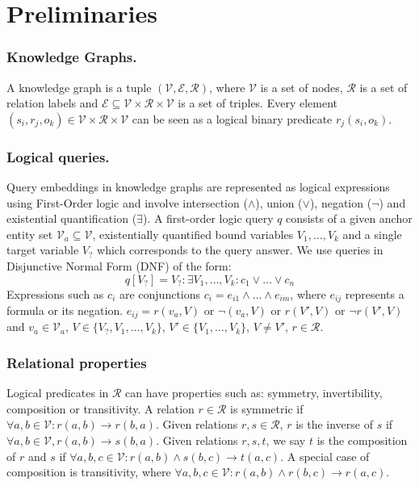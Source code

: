 \documentclass[runningheads]{llncs}
\renewcommand{\paragraph}[1]{\subsubsection{#1}}
\begin{document}
\section{Preliminaries}

\paragraph{Knowledge Graphs. } A knowledge graph is a tuple
$(\mathcal{V}, \mathcal{E}, \mathcal{R})$, where $\mathcal{V}$ is a
set of nodes, $\mathcal{R}$ is a set of relation labels and
$\mathcal{E} \subseteq \mathcal{V} \times \mathcal{R} \times
\mathcal{V}$ is a set of triples. Every element
$(s_i,r_j,o_k) \in \mathcal{V} \times \mathcal{R} \times \mathcal{V}$
can be seen as a logical binary predicate $r_j(s_i,o_k)$.

\paragraph{Logical queries.} Query embeddings in knowledge graphs are
represented as logical expressions using First-Order logic and involve
intersection ($\land$), union ($\lor$), negation ($\neg$) and
existential quantification ($\exists$).  A first-order logic query $q$
consists of a given anchor entity set
$\mathcal{V}_a \subseteq \mathcal{V}$, existentially quantified bound
variables $V_1,\ldots,V_k$ and a single target variable $V_?$ which
corresponds to the query answer. We use queries in Disjunctive Normal
Form (DNF) of the form:
\[
  q[V_?] = V_?:\exists V_1, \ldots, V_k: c_1 \lor \ldots \lor c_n
\]
Expressions such as $c_i$ are conjunctions
$c_i=e_{i1} \land \ldots \land e_{im}$, where $e_{ij}$ represents a
formula or its negation. $e_{ij}=r(v_a, V) $ or $ \neg (v_a, V)$ or
$r(V', V)$ or $\neg r(V',V)$ and $v_a \in \mathcal{V}_a$,
$V\in \{V_?, V_1, \ldots, V_k\}$, $V'\in \{V_1, \ldots, V_k\}$,
$V\neq V'$, $r \in \mathcal{R}$.

\paragraph{Relational properties}
Logical predicates in $\mathcal{R}$ can have properties such as:
symmetry, invertibility, composition or transitivity.
A relation $r \in \mathcal{R}$ is symmetric if
$\forall a,b \in \mathcal{V}: r(a,b) \to r(b,a)$. Given relations
$r,s \in \mathcal{R}$, $r$ is the inverse of $s$ if
$\forall a,b \in \mathcal{V}, r(a,b) \to s(b,a)$. Given relations
$r,s,t$, we say $t$ is the composition of $r$ and $s$ if
$\forall a,b,c \in \mathcal{V}: r(a,b) \land s(b,c) \to t(a,c)$. A
special case of composition is transitivity, where
$\forall a,b,c \in \mathcal{V}: r(a,b) \land r(b,c) \to r(a,c)$.
\end{document}
